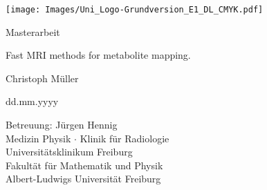 \documentclass[12pt,a4paper]{scrartcl}
\numberwithin{equation}{section}
\begin{document}
  \pagestyle{empty}

%
  \begin{titlepage}

	\begin{center} \large 

	\texttt{[image: Images/Uni\_Logo-Grundversion\_E1\_DL\_CMYK.pdf]} 
    \vspace*{1cm} 

    Masterarbeit
    \vspace*{1cm}

    {\huge Fast MRI methods for metabolite mapping.}
    \vspace*{1.5cm}

    Christoph Müller
    \vspace*{1cm}

    dd.mm.yyyy
    \vspace*{1.5cm}

    Betreuung: Jürgen Hennig \\[.5cm]
		Medizin Physik $\cdot$ Klinik für Radiologie\\
		Universitätsklinikum Freiburg\\[0.5cm]
    
    	Fakultät für Mathematik und Physik \\
		Albert-Ludwigs Universität Freiburg
		
  \end{center}
\end{titlepage}

%
  \tableofcontents

%
\newpage
\pagestyle{headings}





 
%
\newpage
\begin{thebibliography}{Lam00}
 
\end{thebibliography}
      
\end{document}
